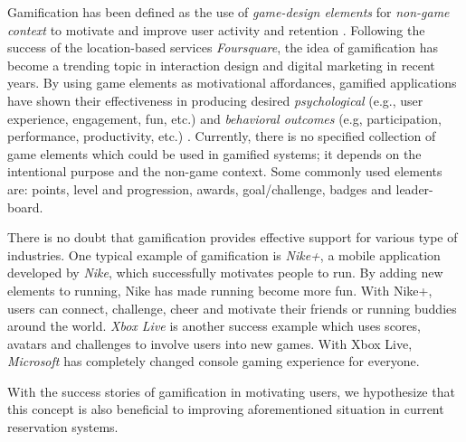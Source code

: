 Gamification has been defined as the use of \emph{game-design elements} for \emph{non-game context} to motivate and improve user activity and retention \cite{deterding2011game, hamari2014does}. Following the success of the location-based services \emph{Foursquare}, the idea of gamification has become a trending topic in interaction design and digital marketing \cite{deterding2011game} in recent years. By using game elements as motivational affordances, gamified applications have shown their effectiveness in producing desired \emph{psychological} (e.g., user experience, engagement, fun, etc.) and \emph{behavioral outcomes} (e.g, participation, performance, productivity, etc.) \cite{deterding2011game}. Currently, there is no specified collection of game elements which could be used in gamified systems; it depends on the intentional purpose and the non-game context. Some commonly used elements are: points, level and progression, awards, goal/challenge, badges and leader-board.

There is no doubt that gamification provides effective support for various type of industries. One typical example of gamification  is \emph{Nike+}, a mobile application developed by \emph{Nike}, which successfully motivates people to run. By adding new elements to running, Nike has made running become more fun. With Nike+, users can connect, challenge, cheer and motivate their friends or running buddies around the world. \emph{Xbox Live} is another success example which uses scores, avatars and challenges to involve users into new games. With Xbox Live, \emph{Microsoft} has completely changed console gaming experience for everyone.
 
With the success stories of gamification in motivating users, we hypothesize that this concept is also beneficial to improving aforementioned situation in current reservation systems.